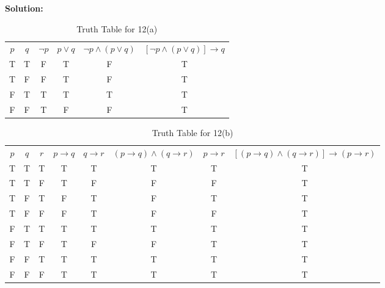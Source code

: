 \documentclass{Axon}
\begin{document}
\noindent
\textbf{Solution:}
\begin{table}[ht]
    \centering
    \begin{tabular}{c|c|c|c|c|c}
        \(p\) & \(q\) & \(\lnot p\) & \(p \lor q\) & \(\lnot p \land (p \lor q)\) & \([\lnot p \land (p \lor q)] \to q\) \\
        T     & T     & F           & T            & F                            & T                                    \\
        T     & F     & F           & T            & F                            & T                                    \\
        F     & T     & T           & T            & T                            & T                                    \\
        F     & F     & T           & F            & F                            & T
    \end{tabular}
    \caption{Truth Table for 12(a)}
\end{table}

\begin{table}[ht]
    \centering
    \begin{tabular}{c|c|c|c|c|c|c|c}
        \(p\) & \(q\) & \(r\) & \(p \to q\) & \(q \to r\) & \((p \to q) \land (q \to r)\) & \(p \to r\) & \([(p \to q) \land (q \to r)] \to (p \to r)\) \\
        T     & T     & T     & T           & T           & T                             & T           & T                                             \\
        T     & T     & F     & T           & F           & F                             & F           & T                                             \\
        T     & F     & T     & F           & T           & F                             & T           & T                                             \\
        T     & F     & F     & F           & T           & F                             & F           & T                                             \\
        F     & T     & T     & T           & T           & T                             & T           & T                                             \\
        F     & T     & F     & T           & F           & F                             & T           & T                                             \\
        F     & F     & T     & T           & T           & T                             & T           & T                                             \\
        F     & F     & F     & T           & T           & T                             & T           & T
    \end{tabular}
    \caption{Truth Table for 12(b)}
\end{table}
\end{document}
